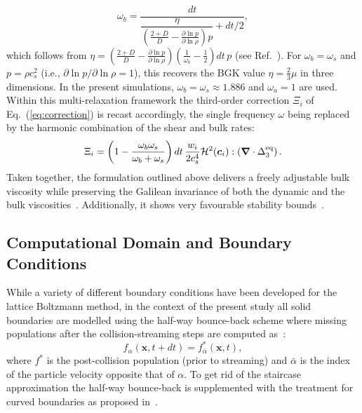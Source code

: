 \begin{equation}
    \omega_b = \frac{dt}{\dfrac{\eta}{\left(\frac{2+D}{D}-\frac{\partial\ln p}{\partial\ln \rho}\right)p} + dt/2},
\end{equation}
which follows from $\eta = \left(\frac{2+D}{D}-\frac{\partial\ln p}{\partial\ln \rho}\right)\left(\frac{1}{\omega_b}-\frac{1}{2}\right)dt\,p$ (see Ref.~\cite{hosseini2022consistent}). For $\omega_b=\omega_s$ and $p=\rho c_s^2$ (i.e., $\partial\ln p/\partial\ln\rho=1$), this recovers the BGK value $\eta=\frac{2}{3}\mu$ in three dimensions. In the present simulations, $\omega_b=\omega_s\approx1.886$ and $\omega_a=1$ are used.
Within this multi-relaxation framework the third-order correction $\Xi_i$ of Eq.~(\ref{eq:correction}) is recast accordingly, the single frequency $\omega$ being replaced by the harmonic combination of the shear and bulk rates:
\begin{equation}\label{eq:correction_MRT}
    \Xi_i = \left(1-\frac{\omega_b\omega_s}{\omega_b+\omega_s}\right)dt\,\frac{w_i}{2c_s^4}\mathcal{H}^2(\bm{c}_i):\left(\bm{\nabla}\cdot\Delta^{\rm eq}_3\right).
\end{equation}
Taken together, the formulation outlined above delivers a freely adjustable bulk viscosity while preserving the Galilean invariance of both the dynamic and the bulk viscosities~\cite{hosseini2022lattice,hosseini2020compressibility}. Additionally, it shows very favourable stability bounds~\cite{hosseini2022lattice,neeraj2023}.

\subsection{Computational Domain and Boundary Conditions}
\label{sec:numerics:domain}

While a variety of different boundary conditions have been developed for the lattice Boltzmann method, in the context of the present study all solid boundaries are modelled using the half-way bounce-back scheme where missing populations after the collision-streaming steps are computed as~\cite{kruger2017lattice}:
\begin{equation}
    f_\alpha\left(\bm{x},t+dt\right) = f^{*}_{\bar{\alpha}}\left(\bm{x},t\right),
\end{equation}
where $f^{*}$ is the post-collision population (prior to streaming) and $\bar{\alpha}$ is the index of the particle velocity opposite that of $\alpha$. To get rid of the staircase approximation the half-way bounce-back is supplemented with the treatment for curved boundaries as proposed in~\mbox{\cite{bouzidi2001momentum}}.

